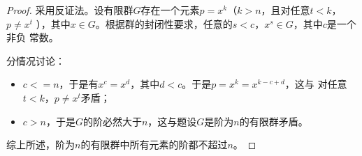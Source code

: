 \begin{proof}
    采用反证法。设有限群$G$存在一个元素$p=x^k$（$k>n$，且对任意$t<k$，$p\neq x^t$
    ），其中$x\in G$。根据群的封闭性要求，任意的$s<c$，$x^s\in G$，其中$c$是一个非负
    常数。
    
    分情况讨论：
    \begin{itemize}
        \item $c<=n$，于是有$x^c=x^d$，其中$d<c$。于是$p=x^k=x^{k-c+d}$，这与
        对任意$t<k$，$p\neq x^t$矛盾；
        \item $c>n$，于是$G$的阶必然大于$n$，这与题设$G$是阶为$n$的有限群矛盾。
    \end{itemize}

    综上所述，阶为$n$的有限群中所有元素的阶都不超过$n$。
\end{proof}